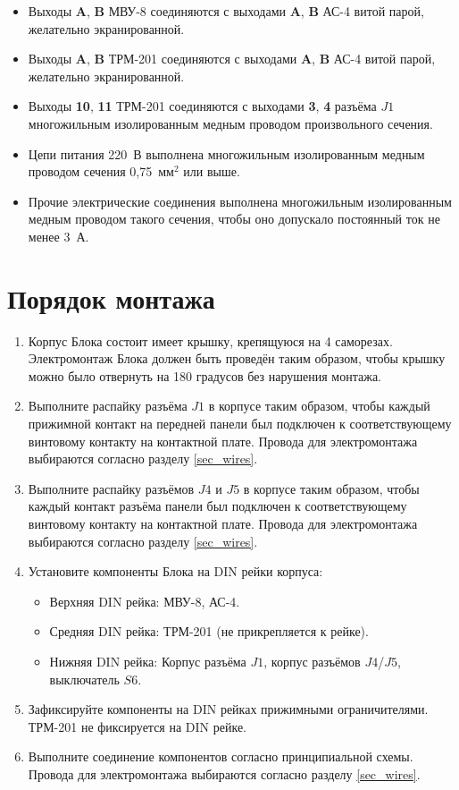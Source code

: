 \documentclass[12pt, a4paper]{article}
\newcommand{\PIN}[1]{{\bf #1}}
\begin{document}
\begin{itemize}
\item Выходы \PIN{A}, \PIN{B} МВУ-8 соединяются с выходами  \PIN{A}, \PIN{B} АС-4 витой парой, желательно экранированной.
\item Выходы \PIN{A}, \PIN{B} ТРМ-201 соединяются с выходами  \PIN{A}, \PIN{B} АС-4 витой парой, желательно экранированной.
\item Выходы \PIN{10}, \PIN{11} ТРМ-201 соединяются с выходами \PIN{3}, \PIN{4} разъёма $J1$ многожильным изолированным медным проводом произвольного сечения.
\item Цепи питания 220~В выполнена многожильным изолированным медным проводом сечения 0,75~мм${}^2$ или выше.
\item Прочие электрические соединения выполнена многожильным изолированным медным проводом такого сечения, чтобы оно допускало постоянный ток не менее 3~А.
\end{itemize}

\section{Порядок монтажа}

\begin{enumerate}

\item Корпус Блока состоит имеет крышку, крепящуюся на 4 саморезах. Электромонтаж Блока должен быть проведён таким образом, чтобы крышку можно было отвернуть на 180 градусов без нарушения монтажа.

\item Выполните распайку разъёма $J1$ в корпусе таким образом, чтобы каждый прижимной контакт на передней панели был подключен к соответствующему винтовому контакту на контактной плате. Провода для электромонтажа выбираются согласно разделу \ref{sec_wires}.

\item Выполните распайку разъёмов $J4$ и $J5$ в корпусе таким образом, чтобы каждый контакт разъёма панели был подключен к соответствующему винтовому контакту на контактной плате. Провода для электромонтажа выбираются согласно разделу \ref{sec_wires}.

\item Установите компоненты Блока на DIN рейки корпуса:

\begin{itemize}
\item Верхняя DIN рейка: МВУ-8, АС-4.
\item Средняя DIN рейка: ТРМ-201 (не прикрепляется к рейке).
\item Нижняя DIN рейка: Корпус разъёма $J1$, корпус разъёмов $J4$/$J5$, выключатель $S6$.
\end{itemize}

\item Зафиксируйте компоненты на DIN рейках прижимными ограничителями. ТРМ-201 не фиксируется на DIN рейке.

\item Выполните соединение компонентов согласно принципиальной схемы. Провода для электромонтажа выбираются согласно разделу \ref{sec_wires}.

\end{enumerate}
\end{document}
